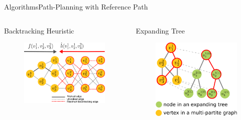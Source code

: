 \begin{frame}{Algorithms}{Path-Planning with Reference Path}

\begin{columns}

\begin{minipage}{\textwidth}
\begin{block}{Backtracking Heuristic}
\begin{figure}
\centering
\includegraphics[width = .7\textwidth]{./figure/backtracking}
\end{figure}
\end{block}
\end{minipage}

\begin{minipage}{\textwidth}
\begin{block}{Expanding Tree}
\begin{figure}
\centering
\includegraphics[width = .7\textwidth]{./figure/multipartite_expandingtree}
\end{figure}
\end{block}
\end{minipage}


\end{columns}
\end{frame}
